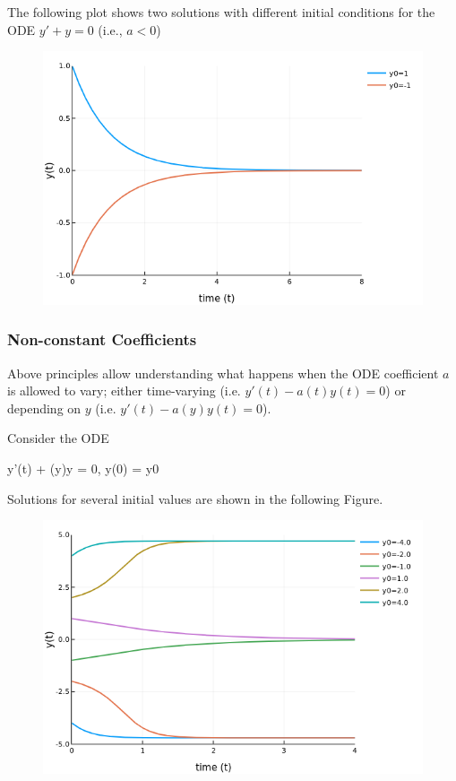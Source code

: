 The following plot shows two solutions with different initial conditions for the ODE $y'+y=0$ (i.e., $a<0$)

\begin{figure}[H]
	\includegraphics[scale=0.5]{images/ode_01_02.png}
\end{figure}


\subsubsection{Non-constant Coefficients}

Above principles allow understanding what happens when the ODE coefficient $a$ is allowed to vary; either time-varying (i.e. $y'(t)-a(t)y(t) = 0$) or depending on $y$ (i.e. $y'(t)-a(y)y(t) = 0$).

Consider the ODE

\bee
y'(t) + \cos(y)y = 0, \quad y(0) = y0
\eee

Solutions for several initial values are shown in the following Figure.

\begin{figure}[H]
	\includegraphics[scale=0.5]{images/ode_01_03.png}
\end{figure}

